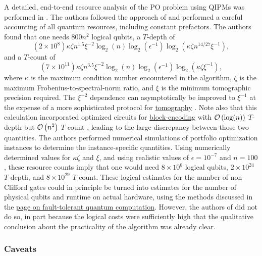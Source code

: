 \begin{refsection}
A detailed, end-to-end resource analysis of the PO problem using QIPMs was performed in \cite{dalzell2022socp}. The authors followed the approach of \cite{kerenidis2019PortfolioOptimization} and performed a careful accounting of all quantum resources, including constant prefactors. The authors found that one needs $800n^2$ logical qubits, a $T$-depth of
\begin{equation*}
    (2\times 10^8)\kappa\zeta n^{1.5}\xi^{-2}\log_2(n)\log_2(\epsilon^{-1})\log_2(\kappa\zeta n^{14/27}\xi^{-1}),
\end{equation*}
and a $T$-count of
\begin{equation*}
    (7\times 10^{11})\kappa\zeta n^{3.5}\xi^{-2}\log_2(n)\log_2(\epsilon^{-1})\log_2(\kappa\zeta \xi^{-1}),
\end{equation*}
where $\kappa$ is the maximum condition number encountered in the algorithm, $\zeta$ is the maximum Frobenius-to-spectral-norm ratio, and $\xi$ is the minimum tomographic precision required. The $\xi^{-2}$ dependence can asymptotically be improved to $\xi^{-1}$ at the expense of a more sophisticated protocol for \hyperref[prim:Tomography]{tomography} \cite{apeldoorn2022TomographyStatePreparationUnitaries}. Note also that this calculation incorporated optimized circuits for \hyperref[prim:BlockEncodingsClassical]{block-encoding} with $\mathcal{O}\left( \log(n) \right)$ $T$-depth but $\mathcal{O}\left( n^2 \right)$  $T$-count \cite{clader2022resourcesForBlockEncoding}, leading to the large discrepancy between those two quantities. The authors performed numerical simulations of portfolio optimization instances to determine the instance-specific quantities. Using numerically determined values for $\kappa\zeta$ and $\xi$, and using realistic values of $\epsilon=10^{-7}$ and $n=100$, these resource counts imply that one would need $8\times 10^6$ logical qubits, $2\times 10^{24}$ $T$-depth, and $8\times 10^{29}$ $T$-count. These logical estimates for the number of non-Clifford gates could in principle be turned into estimates for the number of physical qubits and runtime on actual hardware, using the methods discussed in the \hyperref[prim:FTQC]{page on fault-tolerant quantum computation}. However, the authors of \cite{dalzell2022socp} did not do so, in part because the logical costs were sufficiently high that the qualitative conclusion about the practicality of the algorithm was already clear. 


\subsubsection*{Caveats}


\end{refsection}
